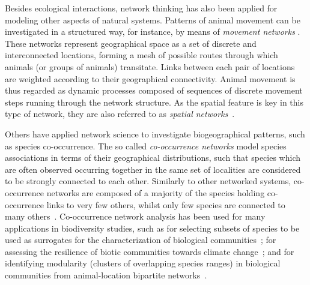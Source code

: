{%
Besides ecological interactions, network thinking has also been applied for modeling other aspects of natural systems.
Patterns of animal movement can be investigated in a structured way, for instance, by means of \textit{movement networks} \cite{Jacoby2016a}.
These networks represent geographical space as a set of discrete and interconnected locations, forming a mesh of possible routes through which animals (or groups of animals) transitate. 
Links between each pair of locations are weighted according to their geographical connectivity.
Animal movement is thus regarded as dynamic processes composed of sequences of discrete movement steps running through the network structure.
As the spatial feature is key in this type of network, they are also referred to as \textit{spatial networks}~\cite{Bascompte2007}.
%

Others have applied network science to investigate biogeographical patterns, such as species co-occurrence. 
The so called \textit{co-occurrence networks} model species associations in terms of their geographical distributions, such that species which are often observed occurring together in the same set of localities are considered to be strongly connected to each other.
Similarly to other networked systems, co-occurrence networks are composed of a majority of the species holding co-occurrence links to very few others, whilst only few species are connected to many others~\cite{Araujo2011a}.
Co-occurrence network analysis has been used for many applications in biodiversity studies, such as for selecting subsets of species to be used as surrogates for the characterization of biological communities~\cite{Tulloch2016};
for assessing the resilience of biotic communities towards climate change~\cite{Araujo2011a};
and for identifying modularity (clusters of overlapping species ranges) in biological communities from animal-location bipartite networks~\cite{Thebault2013}.

}
